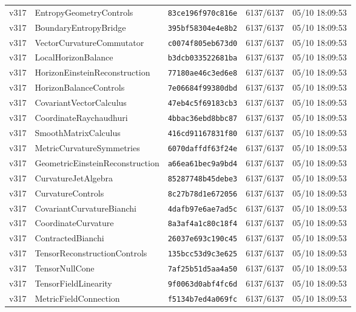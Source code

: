 \documentclass[11pt]{article}
\theoremstyle{definition}\newtheorem{deriv}{Derivation}
\begin{document}
{\begin{longtable}{@{}lllll@{}}
v317 & EntropyGeometryControls & \texttt{83ce196f970c816e} & 6137/6137 & 05/10 18:09:53 \\
v317 & BoundaryEntropyBridge & \texttt{395bf58304e4e8b2} & 6137/6137 & 05/10 18:09:53 \\
v317 & VectorCurvatureCommutator & \texttt{c0074f805eb673d0} & 6137/6137 & 05/10 18:09:53 \\
v317 & LocalHorizonBalance & \texttt{b3dcb033522681ba} & 6137/6137 & 05/10 18:09:53 \\
v317 & HorizonEinsteinReconstruction & \texttt{77180ae46c3ed6e8} & 6137/6137 & 05/10 18:09:53 \\
v317 & HorizonBalanceControls & \texttt{7e06684f99380dbd} & 6137/6137 & 05/10 18:09:53 \\
v317 & CovariantVectorCalculus & \texttt{47eb4c5f69183cb3} & 6137/6137 & 05/10 18:09:53 \\
v317 & CoordinateRaychaudhuri & \texttt{4bbac36ebd8bbc87} & 6137/6137 & 05/10 18:09:53 \\
v317 & SmoothMatrixCalculus & \texttt{416cd91167831f80} & 6137/6137 & 05/10 18:09:53 \\
v317 & MetricCurvatureSymmetries & \texttt{6070daffdf63f24e} & 6137/6137 & 05/10 18:09:53 \\
v317 & GeometricEinsteinReconstruction & \texttt{a66ea61bec9a9bd4} & 6137/6137 & 05/10 18:09:53 \\
v317 & CurvatureJetAlgebra & \texttt{85287748b45debe3} & 6137/6137 & 05/10 18:09:53 \\
v317 & CurvatureControls & \texttt{8c27b78d1e672056} & 6137/6137 & 05/10 18:09:53 \\
v317 & CovariantCurvatureBianchi & \texttt{4dafb97e6ae7ad5c} & 6137/6137 & 05/10 18:09:53 \\
v317 & CoordinateCurvature & \texttt{8a3af4a1c80c18f4} & 6137/6137 & 05/10 18:09:53 \\
v317 & ContractedBianchi & \texttt{26037e693c190c45} & 6137/6137 & 05/10 18:09:53 \\
v317 & TensorReconstructionControls & \texttt{135bcc53d9c3e625} & 6137/6137 & 05/10 18:09:53 \\
v317 & TensorNullCone & \texttt{7af25b51d5aa4a50} & 6137/6137 & 05/10 18:09:53 \\
v317 & TensorFieldLinearity & \texttt{9f0063d0abf4fc6d} & 6137/6137 & 05/10 18:09:53 \\
v317 & MetricFieldConnection & \texttt{f5134b7ed4a069fc} & 6137/6137 & 05/10 18:09:53 \\

\end{longtable}}
\end{document}

